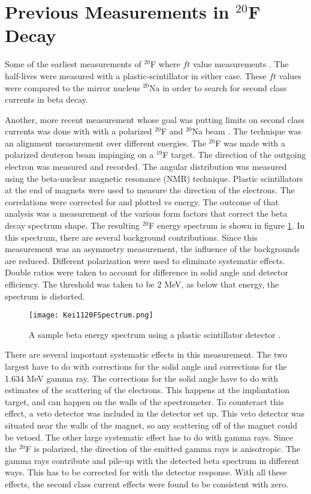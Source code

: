 \documentclass[../MaxHughesThesis.tex]{subfiles}
\begin{document}
\section{Previous Measurements in $^{20}$F Decay}

Some of the earliest measurements of $^{20}$F where $ft$ value measurements \cite{Wil70} \cite{Alb75}.
The half-lives were measured with a plastic-scintillator in either case.  
These $ft$ values were compared to the mirror nucleus $^{20}$Na in order to search for second class currents in beta decay. 

Another, more recent measurement whose goal was putting limits on second class currents was done with with a polarized $^{20}$F and $^{20}$Na beam \cite{Min11}.
The technique was an alignment measurement over different energies.
The $^{20}$F was made with a polarized deuteron beam impinging on a $^{19}$F target. 
The direction of the outgoing electron was measured and recorded.
The angular distribution was measured using the beta-nuclear magnetic resonance (NMR) technique.
Plastic scintillators at the end of magnets were used to measure the direction of the electrons.
The correlations were corrected for and plotted vs energy.
The outcome of that analysis was a measurement of the various form factors that correct the beta decay spectrum shape. 
The resulting $^{20}$F energy spectrum is shown in figure \ref{fig:keispec}.
In this spectrum, there are several background contributions. 
Since this measurement  was an asymmetry measurement, the influence of the backgrounds are reduced. 
Different polarization were used to eliminate systematic effects.
Double ratios were taken to account for difference in solid angle and detector efficiency.
The threshold was taken to be 2 MeV, as below that energy, the spectrum is distorted.

\begin{figure}[!htb]
	\centerline{\texttt{[image: Kei1120FSpectrum.png]}}
	\caption{A sample beta energy spectrum using a plastic scintillator detector \cite{Min11}.}
	\label{fig:keispec}
\end{figure}

There are several important systematic effects in this measurement.
The two largest have to do with corrections for the solid angle and corrections for the 1.634 MeV gamma ray.
The corrections for the solid angle have to do with estimates of the scattering of the electrons.
This happens at the implantation target, and can happen on the walls of the spectrometer.
To counteract this effect, a veto detector was included in the detector set up. 
This veto detector was situated near the walls of the magnet, so any scattering off of the magnet could be vetoed. 
The other large systematic effect has to do with gamma rays.
Since the $^{20}$F is polarized, the direction of the emitted gamma rays is anisotropic.
The gamma rays contribute and pile-up with the detected beta spectrum in different ways.
This has to be corrected for with the detector response.
With all these effects, the second class current effects were found to be consistent with zero.   
\end{document}
